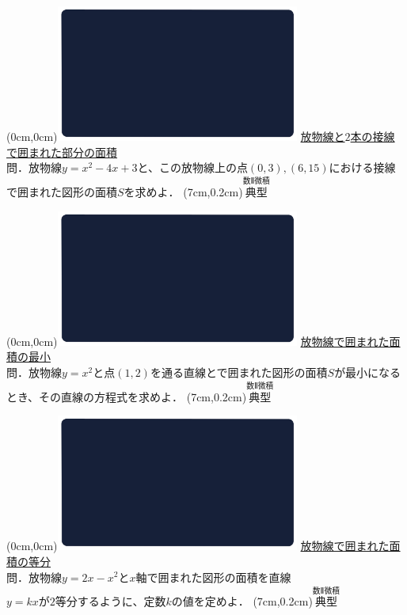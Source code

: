 \documentclass[10pt,
fleqn,
dvipdfmx,
uplatex
]{jsarticle}
\begin{document}
\newpage



\bf\boldmath

\at(0cm,0cm){\includegraphics[width=8cm,bb=0 0 1920 1080]{./youtube/thumbnails/templates/smart_background/数II微積.jpeg}}
{\color{orange}\normalsize\underline{放物線と$2$本の接線で囲まれた部分の面積}}\vspace{0.3zw}\\
\Large
問．放物線$y=x^2-4x+3$と、この放物線上の点$\left(0,3\right),\left(6,{15}\right)$における接線で囲まれた図形の面積$S$を求めよ．
\at(7cm,0.2cm){\small\color{bradorange}$\overset{\text{数Ⅱ微積}}{\text{典型}}$}

\newpage

\at(0cm,0cm){\includegraphics[width=8cm,bb=0 0 1920 1080]{./youtube/thumbnails/templates/smart_background/数II微積.jpeg}}
{\color{orange}\Large\underline{放物線で囲まれた面積の最小}}\vspace{0.3zw}\\
\Large
問．放物線$y=x^2$と点$\left(1,2\right)$を通る直線とで囲まれた図形の面積$S$が最小になるとき、その直線の方程式を求めよ．
\at(7cm,0.2cm){\small\color{bradorange}$\overset{\text{数Ⅱ微積}}{\text{典型}}$}

\newpage

\at(0cm,0cm){\includegraphics[width=8cm,bb=0 0 1920 1080]{./youtube/thumbnails/templates/smart_background/数II微積.jpeg}}
{\color{orange}\Large\underline{放物線で囲まれた面積の等分}}\vspace{0.3zw}\\
\Large 
問．放物線$y=2x-x^2$と$x$軸で囲まれた図形の面積を直線\\$y=kx$が$2$等分するように、定数$k$の値を定めよ．
\at(7cm,0.2cm){\small\color{bradorange}$\overset{\text{数Ⅱ微積}}{\text{典型}}$}
\end{document}
